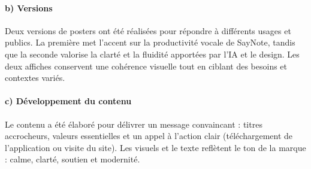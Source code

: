 \paragraph*{b) Versions}
Deux versions de posters ont été réalisées pour répondre à différents usages et publics. La première met l’accent sur la productivité vocale de SayNote, tandis que la seconde valorise la clarté et la fluidité apportées par l’IA et le design. Les deux affiches conservent une cohérence visuelle tout en ciblant des besoins et contextes variés.

\paragraph*{c) Développement du contenu}
Le contenu a été élaboré pour délivrer un message convaincant : titres accrocheurs, valeurs essentielles et un appel à l’action clair (téléchargement de l’application ou visite du site). Les visuels et le texte reflètent le ton de la marque : calme, clarté, soutien et modernité.

